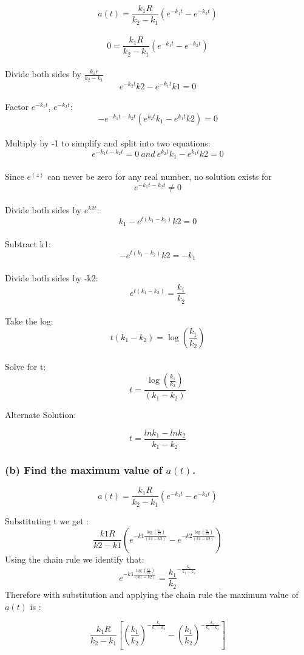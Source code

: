 \documentclass[]{article}
\begin{document}
\[a(t) = \frac{k_1 R}{k_2 - k_1}(e^{-k_1 t}-e^{-k_2 t})\]\\
\[0 = \frac{k_1 R}{k_2 - k_1}(e^{-k_1 t}-e^{-k_2 t})\]\\
Divide both sides by \(\frac{k_1 r}{k_2 - k_1}\)\\
\[e^{-k_2 t}k2 - e^{-k_1 t}k1 = 0\]\\
Factor \(e^{-k_1 t}\), \(e^{-k_2 t}\):\\
\[-e^{-k_1 t - k_2 t}(e^{k_2 t}k_1 - e^{k_1 t}k2) = 0\]\\
Multiply by -1 to simplify and split into two equations:\\
\[e^{-k_1 t - k_2 t} = 0 ~and~e^{k_2 t}k_1 - e^{k_1 t}k2= 0\]\\
Since \(e^(z)\) can never be zero for any real number, no solution
exists for \[e^{-k_1 t - k_2 t} \neq 0\]\\
Divide both sides by \(e^{k2 t}\):\\
\[k_1 - e^{t (k_1 - k_2)}k2= 0\]\\
Subtract k1:\\
\[- e^{t (k_1 - k_2)}k2= -k_1\]\\
Divide both sides by -k2:\\
\[e^{t (k_1 - k_2)}= \frac{k_1}{k_2}\]\\
Take the log: \[t (k_1 - k_2)= \log{(\frac{k_1}{k_2})}\]\\
Solve for t: \[t = \frac{\log{(\frac{k_1}{k_2})}}{(k_1 - k_2)}\]

Alternate Solution:

\[t = \frac{lnk_1 - lnk_2}{k_1 - k_2}\]

\newpage

\subsubsection{\texorpdfstring{(b) Find the maximum value of
\(a(t)\).}{(b) Find the maximum value of a(t).}}\label{b-find-the-maximum-value-of-at.}

\[a(t) = \frac{k_1R}{k_2-k_1}(e^{-k_1t}-e^{-k_2t})\]

Substituting t we get :
\[\frac{k1 R}{k2 - k1}(e^{-k1 \frac{\log{(\frac{k1}{k2})}}{(k1 - k2)}}-e^{-k2 \frac{\log{(\frac{k1}{k2})}}{(k1 - k2)}})\]
Using the chain rule we identify that:
\[e^{-k1 \frac{\log{(\frac{k1}{k2})}}{(k1 - k2)}}=\frac{k_1}{k_2}^{-\frac{k_1}{k_1 - k_2}}\]
Therefore with substitution and applying the chain rule the maximum
value of \(a(t)\) is :

\[\frac{k_1R}{k_2-k_1}[(\frac{k_1}{k_2})^{-\frac{k_1}{k_1-k_2}}-(\frac{k_1}{k_2})^{-\frac{k_2}{k_1-k_2}}]\]
\end{document}
